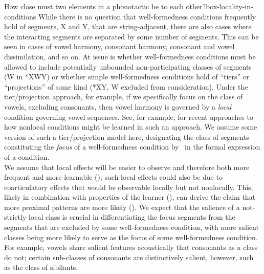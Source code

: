 \begin{dadpbox}{How close must two elements in a phonotactic be to each other?}{box-locality-in-conditions}
While there is no question that well-formedness conditions frequently hold of segments, X and Y, that are string-adjacent, there are also cases where the interacting segments are separated by some number of segments. This can be seen in cases of vowel harmony, consonant harmony, consonant and vowel dissimilation, and so on. At issue is whether well-formedness conditions must be allowed to include potentially unbounded non-participating classes of segments (W in *XWY) or whether simple well-formedness conditions hold of ``tiers'' or ``projections'' of some kind (*XY, W excluded from consideration). Under the tier/projection approach, for example, if we specifically focus on the class of vowels, excluding consonants, then vowel harmony is governed by a {\it local} condition governing vowel sequences. See, for example, \citet{Jardine:2016, Jardine+:2016, Gouskova+:2020} for recent approaches to how nonlocal conditions might be learned in such an approach. We assume some version of such a tier/projection model here, designating the class of segments constituting the \textit{focus} of a well-formedness condition by \tier\ in the formal expression of a condition.\\

We assume that local effects will be easier to observe and therefore both more frequent and more learnable (\citealt{Finley:2011, Finley:2012, McMullin:2016}); such local effects could also be due to coarticulatory effects that would be observable locally but not nonlocally. This, likely in combination with properties of the learner (\citealt{Hayes+:2008, Gouskova+:2020}), can derive the claim that more proximal  patterns are more likely (\citealt{Suzuki:1998, Pulleyblank:2002, Rose+:2004, Hansson:2010}). We expect that the salience of a not-strictly-local class is crucial in differentiating  the focus segments from the segments that are excluded by some well-formedness condition, with  more salient  classes being more likely to serve as the focus of some  well-formedness condition. For example, vowels share salient features acoustically that consonants as a class do not; certain sub-classes of consonants are distinctively salient, however, such as the class of sibilants. \\ 
\end{dadpbox}

